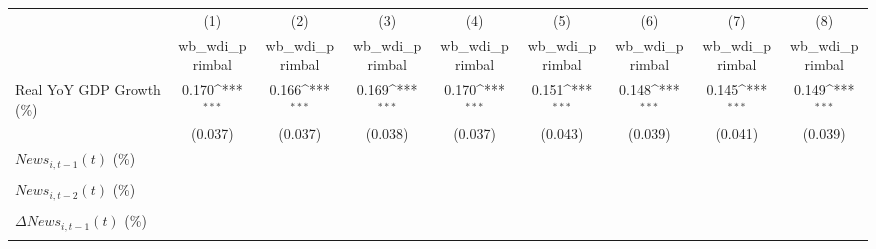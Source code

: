 {
\def\sym#1{\ifmmode^{#1}\else\(^{#1}\)\fi}
\begin{tabular}{l*{8}{c}}
\toprule
                    &\multicolumn{1}{c}{(1)}&\multicolumn{1}{c}{(2)}&\multicolumn{1}{c}{(3)}&\multicolumn{1}{c}{(4)}&\multicolumn{1}{c}{(5)}&\multicolumn{1}{c}{(6)}&\multicolumn{1}{c}{(7)}&\multicolumn{1}{c}{(8)}\\
                    &\multicolumn{1}{c}{wb_wdi_primbal}&\multicolumn{1}{c}{wb_wdi_primbal}&\multicolumn{1}{c}{wb_wdi_primbal}&\multicolumn{1}{c}{wb_wdi_primbal}&\multicolumn{1}{c}{wb_wdi_primbal}&\multicolumn{1}{c}{wb_wdi_primbal}&\multicolumn{1}{c}{wb_wdi_primbal}&\multicolumn{1}{c}{wb_wdi_primbal}\\
\midrule
Real YoY GDP Growth (\%)&       0.170\sym{***}&       0.166\sym{***}&       0.169\sym{***}&       0.170\sym{***}&       0.151\sym{***}&       0.148\sym{***}&       0.145\sym{***}&       0.149\sym{***}\\
                    &     (0.037)         &     (0.037)         &     (0.038)         &     (0.037)         &     (0.043)         &     (0.039)         &     (0.041)         &     (0.039)         \\
\addlinespace
$ News_{i,t-1}(t)$ (\%)&                     &                     &                     &                     &                     &                     &                     &                     \\
                    &                     &                     &                     &                     &                     &                     &                     &                     \\
\addlinespace
$ News_{i,t-2}(t)$ (\%)&                     &                     &                     &                     &                     &                     &                     &                     \\
                    &                     &                     &                     &                     &                     &                     &                     &                     \\
\addlinespace
$ \Delta News_{i,t-1}(t)$ (\%)&                     &                     &                     &                     &                     &                     &                     &                     \\
                    &                     &                     &                     &                     &                     &                     &                     &                     \\

\end{tabular}}
